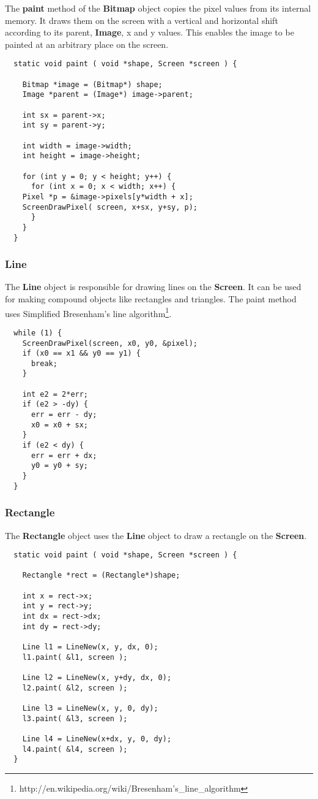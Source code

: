 The {\bf paint} method of the {\bf Bitmap} object copies the pixel
values from its internal memory. It draws them on the screen with a
vertical and horizontal shift according to its parent, {\bf Image}, x
and y values. This enables the image to be painted at an arbitrary
place on the screen.

\begin{lstlisting}
  static void paint ( void *shape, Screen *screen ) {

    Bitmap *image = (Bitmap*) shape;
    Image *parent = (Image*) image->parent;

    int sx = parent->x;
    int sy = parent->y;

    int width = image->width;
    int height = image->height;

    for (int y = 0; y < height; y++) {
      for (int x = 0; x < width; x++) {
	Pixel *p = &image->pixels[y*width + x];
	ScreenDrawPixel( screen, x+sx, y+sy, p);
      }
    }
  }
\end{lstlisting}

\subsubsection{Line}
The {\bf Line} object is responsible for drawing lines on the {\bf Screen}. It can be
used for making compound objects like rectangles and triangles. The paint method uses
Simplified Bresenham's line algorithm\footnote{http://en.wikipedia.org/wiki/Bresenham's\_line\_algorithm}.

\begin{lstlisting}
  while (1) {
    ScreenDrawPixel(screen, x0, y0, &pixel);
    if (x0 == x1 && y0 == y1) {
      break;
    }

    int e2 = 2*err;
    if (e2 > -dy) {
      err = err - dy;
      x0 = x0 + sx;
    }
    if (e2 < dy) {
      err = err + dx;
      y0 = y0 + sy;
    }
  }

\end{lstlisting}

\subsubsection{Rectangle}
The {\bf Rectangle} object uses the {\bf Line} object to draw a rectangle on the {\bf Screen}.
\begin{lstlisting}
  static void paint ( void *shape, Screen *screen ) {

    Rectangle *rect = (Rectangle*)shape;

    int x = rect->x;
    int y = rect->y;
    int dx = rect->dx;
    int dy = rect->dy;

    Line l1 = LineNew(x, y, dx, 0);
    l1.paint( &l1, screen );

    Line l2 = LineNew(x, y+dy, dx, 0);
    l2.paint( &l2, screen );

    Line l3 = LineNew(x, y, 0, dy);
    l3.paint( &l3, screen );

    Line l4 = LineNew(x+dx, y, 0, dy);
    l4.paint( &l4, screen );
  }
\end{lstlisting}
